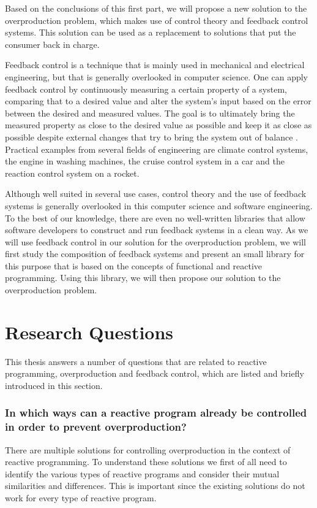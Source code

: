 Based on the conclusions of this first part, we will propose a new solution to the overproduction problem, which makes use of control theory and feedback control systems. This solution can be used as a replacement to solutions that put the consumer back in charge.

Feedback control is a technique that is mainly used in mechanical and electrical engineering, but that is generally overlooked in computer science. One can apply feedback control by continuously measuring a certain property of a system, comparing that to a desired value and alter the system's input based on the error between the desired and measured values. The goal is to ultimately bring the measured property as close to the desired value as possible and keep it as close as possible despite external changes that try to bring the system out of balance \cite{janert2013-feedback}. Practical examples from several fields of engineering are climate control systems, the engine in washing machines, the cruise control system in a car and the reaction control system on a rocket.

Although well suited in several use cases, control theory and the use of feedback systems is generally overlooked in this computer science and software engineering. To the best of our knowledge, there are even no well-written libraries that allow software developers to construct and run feedback systems in a clean way. As we will use feedback control in our solution for the overproduction problem, we will first study the composition of feedback systems and present an small library for this purpose that is based on the concepts of functional and reactive programming. Using this library, we will then propose our solution to the overproduction problem.

\section*{Research Questions}
This thesis answers a number of questions that are related to reactive programming, overproduction and feedback control, which are listed and briefly introduced in this section.

\subsubsection*{In which ways can a reactive program already be controlled in order to prevent overproduction?}
There are multiple solutions for controlling overproduction in the context of reactive programming. To understand these solutions we first of all need to identify the various types of reactive programs and consider their mutual similarities and differences. This is important since the existing solutions do not work for every type of reactive program.

